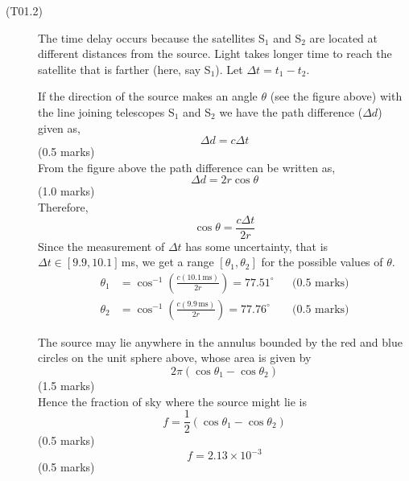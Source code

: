 \begin{description}
\item[(T01.2)]
The time delay occurs because the satellites S$_1$ and S$_2$ are located at
different distances from the source. Light takes longer time to reach the
satellite that is farther (here, say S$_1$). Let $\Delta t = t_1 - t_2$.


If the direction of the source makes an angle $\theta$ (see the figure
above) with the line joining telescopes S$_1$ and S$_2$ we have the path
difference ($\Delta d$) given as,
\[ \Delta d = c\Delta t \]
\hfill(0.5 marks)\\
From the figure above the path difference can be written as,
\[ \Delta d = 2r\cos\theta \]
\hfill(1.0 marks)\\
Therefore,
\[ \cos\theta = \frac{c\Delta t}{2r} \]
Since the measurement of $\Delta t$ has some uncertainty, that is
$\Delta t \in [9.9, 10.1]$\,ms, we get a range $[\theta_1, \theta_2]$ for the
possible values of $\theta$.
\begin{align*}
\theta_1 &= \cos^{-1}\left(\frac{c(10.1\,\mathrm{ms})}{2r}\right)
  = 77.51^\circ
  && \text{(0.5 marks)} \\
\theta_2 &= \cos^{-1}\left(\frac{c(9.9\,\mathrm{ms})}{2r}\right)
  = 77.76^\circ
  && \text{(0.5 marks)}
\end{align*}


The source may lie anywhere in the annulus bounded by the red and blue
circles on the unit sphere above, whose area is given by
\[ 2\pi(\cos\theta_1 - \cos\theta_2) \]
\hfill(1.5 marks)\\
Hence the fraction of sky where the source might lie is
\[ f = \frac{1}{2}(\cos\theta_1 - \cos\theta_2) \]
\hfill(0.5 marks)
\[ f = 2.13 \times 10^{-3} \]
\hfill(0.5 marks)
\end{description}

